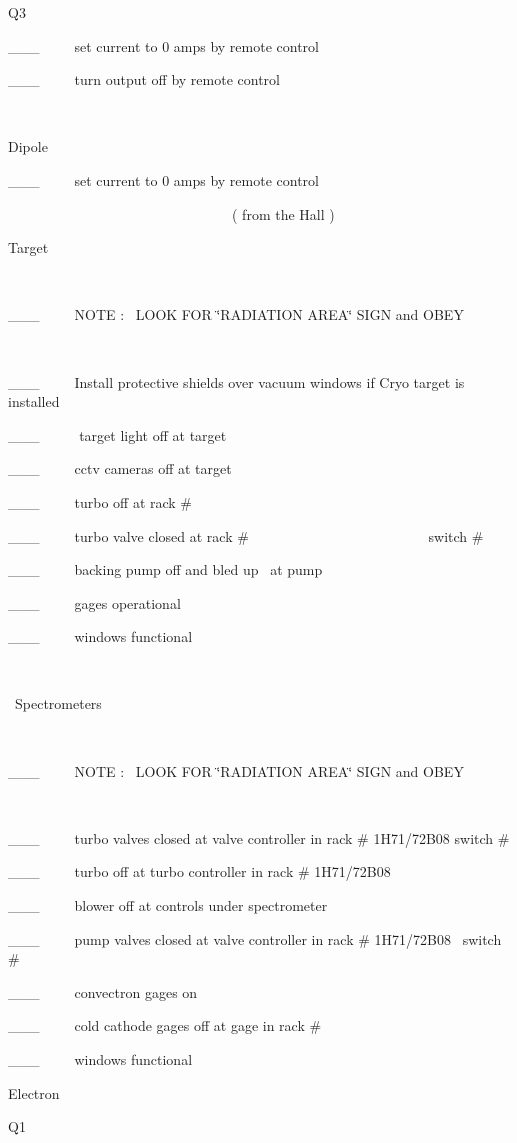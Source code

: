 Q3

\_\_\_~~~~~set current to 0 amps by remote control 

\_\_\_~~~~~turn output off by remote control 

~

Dipole

\_\_\_~~~~~set current to 0 amps by remote control 
~

~~~~~~~~~~~~~~~~~~~~~~~~~~~~~~~~( from the Hall )

Target

~

\_\_\_~~~~~NOTE :~ LOOK FOR \char`\"{}RADIATION AREA\char`\"{} SIGN and OBEY

~

\_\_\_~~~~~Install protective shields over vacuum windows if Cryo target is
installed

\_\_\_~~~~~ target light off at target

\_\_\_~~~~~cctv cameras off at target

\_\_\_~~~~~turbo off at rack \#

\_\_\_~~~~~turbo valve closed at rack \#~~~~~~~~~~~~~~~~~~~~~~~~~ switch \#

\_\_\_~~~~~backing pump off and bled up~ at pump

\_\_\_~~~~~gages operational

\_\_\_~~~~~windows functional

~


~Spectrometers

~

\_\_\_~~~~~NOTE :~ LOOK FOR \char`\"{}RADIATION AREA\char`\"{} SIGN and OBEY

~

\_\_\_~~~~~turbo valves closed at valve controller in rack \# 1H71/72B08 switch
\#

\_\_\_~~~~~turbo off at turbo controller in rack \# 1H71/72B08

\_\_\_~~~~~blower off at controls under spectrometer

\_\_\_~~~~~pump valves closed at valve controller in rack \# 1H71/72B08~ switch
\# 

\_\_\_~~~~~convectron gages on

\_\_\_~~~~~cold cathode gages off at gage in rack \#

\_\_\_~~~~~windows functional


Electron

Q1

